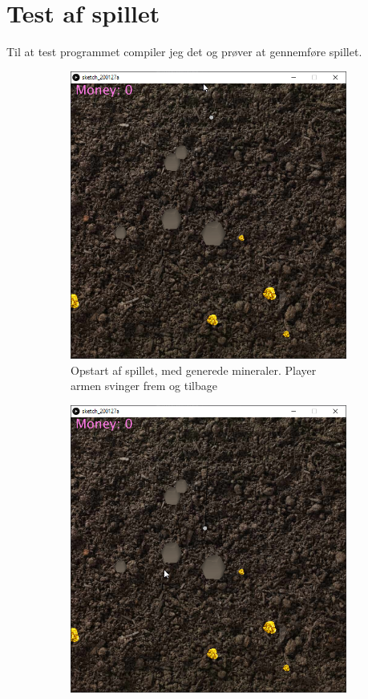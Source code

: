 \documentclass[12pt,a4paper]{article}
\begin{document}
\section{Test af spillet}
    Til at test programmet compiler jeg det og prøver at gennemføre spillet.
    \begin{figure}[H]
        \begin{subfigure}{.5\textwidth}
            \centering
            \includegraphics[width=.98\linewidth]{1.png}
            \caption{Opstart af spillet, med generede mineraler. Player armen svinger frem og tilbage}
        \end{subfigure}
        \begin{subfigure}{.5\textwidth}
            \centering
            \includegraphics[width=.98\linewidth]{2.png}

\end{subfigure}
\end{figure}
\end{document}
